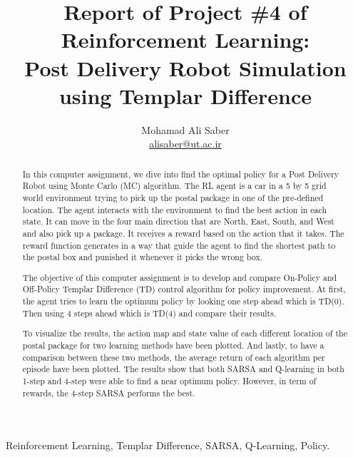 \documentclass[lettersize,journal]{IEEEtran}
\begin{document}
\title{Report of Project \#4 of Reinforcement Learning: \\Post Delivery Robot Simulation using Templar Difference}

\author{Mohamad Ali Saber \\ \href{mailto:alisaber@ut.ac.ir}{alisaber@ut.ac.ir}}
\maketitle

\begin{abstract}
In this computer assignment, we dive into find the optimal policy for a Post Delivery Robot using Monte Carlo (MC) algorithm. The RL agent is a car in a 5 by 5 grid world environment trying to pick up the postal package in one of the pre-defined location. The agent interacts with the environment to find the best action in each state. It can move in the four main direction that are North, East, South, and West and also pick up a package. It receives a reward based on the action that it takes. The reward function generates in a way that guide the agent to find the shortest path to the postal box and punished it whenever it picks the wrong box.\par

The objective of this computer assignment is to develop and compare On-Policy and Off-Policy Templar Difference (TD) control algorithm for policy improvement. At first, the agent tries to learn the optimum policy by looking one step ahead which is TD(0). Then using 4 steps ahead which is TD(4) and compare their results.\par

To visualize the results, the action map and state value of each different location of the postal package for two learning methods have been plotted. And lastly, to have a comparison between these two methods, the average return of each algorithm per episode have been plotted. The results show that both SARSA and Q-learning in both 1-step and 4-step were able to find a near optimum policy. However, in term of rewards, the 4-step SARSA performs the best.
\end{abstract}

\begin{IEEEkeywords}
Reinforcement Learning, Templar Difference, SARSA, Q-Learning, Policy.
\end{IEEEkeywords}




\end{document}

